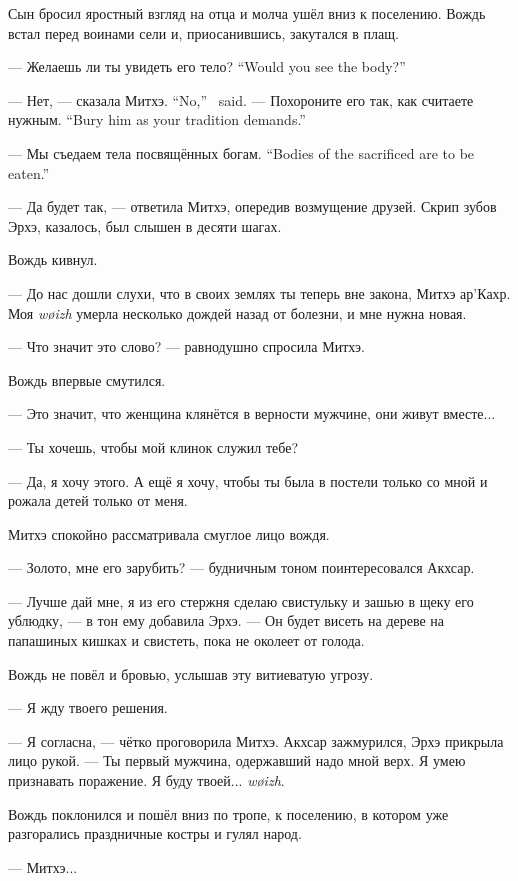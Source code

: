 Сын бросил яростный взгляд на отца и молча ушёл вниз к поселению.
Вождь встал перед воинами сели и, приосанившись, закутался в плащ.

{--- Желаешь ли ты увидеть его тело?}
{``Would you see the body?''}

{--- Нет, --- сказала Митхэ.}
{``No,'' \Mitchoe\ said.}
{--- Похороните его так, как считаете нужным.}
{``Bury him as your tradition demands.''}

{--- Мы съедаем тела посвящённых богам.}
{``Bodies of the sacrificed are to be eaten.''}

--- Да будет так, --- ответила Митхэ, опередив возмущение друзей.
Скрип зубов Эрхэ, казалось, был слышен в десяти шагах.

Вождь кивнул.

--- До нас дошли слухи, что в своих землях ты теперь вне закона, Митхэ ар’Кахр.
Моя \textit{w\o{}izh} умерла несколько дождей назад от болезни, и мне нужна новая.

--- Что значит это слово? --- равнодушно спросила Митхэ.

Вождь впервые смутился.

--- Это значит, что женщина клянётся в верности мужчине, они живут вместе...

--- Ты хочешь, чтобы мой клинок служил тебе?

--- Да, я хочу этого.
А ещё я хочу, чтобы ты была в постели только со мной и рожала детей только от меня.

Митхэ спокойно рассматривала смуглое лицо вождя.

--- Золото, мне его зарубить? --- будничным тоном поинтересовался Акхсар.

--- Лучше дай мне, я из его стержня сделаю свистульку и зашью в щеку его ублюдку, --- в тон ему добавила Эрхэ.
--- Он будет висеть на дереве на папашиных кишках и свистеть, пока не околеет от голода.

Вождь не повёл и бровью, услышав эту витиеватую угрозу.

--- Я жду твоего решения.

--- Я согласна, --- чётко проговорила Митхэ.
Акхсар зажмурился, Эрхэ прикрыла лицо рукой.
--- Ты первый мужчина, одержавший надо мной верх.
Я умею признавать поражение.
Я буду твоей... \textit{w\o{}izh}.

Вождь поклонился и пошёл вниз по тропе, к поселению, в котором уже разгорались праздничные костры и гулял народ.

--- Митхэ...

